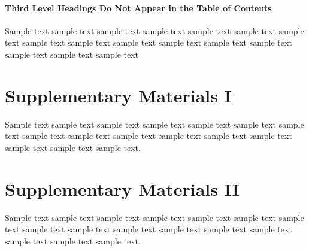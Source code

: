 \documentclass[11pt]{uonthesis}
\begin{document}


\subsubsection{Third Level Headings Do Not Appear in the Table of Contents}

Sample text sample text sample text sample text sample text sample
text sample text sample text sample text sample text sample text
sample text sample text sample text sample text sample text~\cite{Lam94}


\begin{appendices}

\chapter{Supplementary Materials I}

Sample text sample text sample text sample text sample text sample
text sample text sample text sample text sample text sample text
sample text sample text sample text sample text sample text.

\chapter{Supplementary Materials II}

Sample text sample text sample text sample text sample text sample
text sample text sample text sample text sample text sample text
sample text sample text sample text sample text sample text.

\end{appendices}
\end{document}
